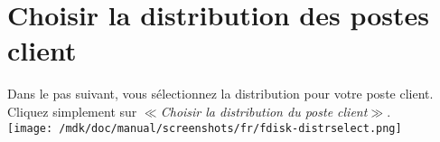 \section{Choisir la distribution des postes client}Dans le pas suivant, vous s\'electionnez la distribution pour votre poste client. Cliquez simplement sur \textit{$\ll$Choisir la distribution du poste client$\gg$}.\\
\texttt{[image: /mdk/doc/manual/screenshots/fr/fdisk-distrselect.png]} \\
